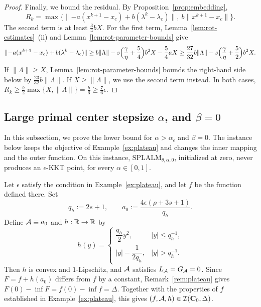 \begin{proof}
Finally, we bound the residual. By Proposition~\ref{prop:embedding},
\[
R_k=\max\bigl\{\|{-a}(x^{k+1}-x_c)+b(\lambda^k-\lambda_c)\|,\
b\|x^{k+1}-x_c\|\bigr\}.
\]
The second term is at least \(\frac34bX\). For the first term,
Lemma~\ref{lem:rot-estimates}~(ii) and Lemma~\ref{lem:rot-parameter-bounds} give
\[
\|{-a}(x^{k+1}-x_c)+b(\lambda^k-\lambda_c)\|
\ge b\|\Lambda\|-s\Bigl(\frac{\gamma}{\eta}+\frac54\Bigr)b^2X-\frac54aX
\ge\frac{27}{32}b\|\Lambda\|-s\Bigl(\frac{\gamma}{\eta}+\frac52\Bigr)b^2X .
\]
If \(\|\Lambda\|\ge X\), Lemma~\ref{lem:rot-parameter-bounds} bounds the
right-hand side below by \(\frac{23}{32}b\|\Lambda\|\). If
\(X\ge\|\Lambda\|\), we use the second term instead. In both cases,
\(R_k\ge\frac b2\max\{X,\|\Lambda\|\}=\frac b6\ge\frac76\epsilon\).
\end{proof}
 


\subsection{Large primal center stepsize \texorpdfstring{$\alpha$}{alpha}, and \texorpdfstring{$\beta=0$}{beta=0}}
\label{subsec:lb-huber}

In this subsection, we prove the lower bound for \(\alpha>\alpha_\epsilon\)
and \(\beta=0\). The instance below keeps the objective of
Example~\ref{ex:plateau} and changes the inner mapping and the outer
function. On this instance, \(\mathrm{SPLALM}_{\theta,\alpha,0}\), initialized
at zero, never produces an \(\epsilon\)-KKT point, for every
\(\alpha\in[0,1]\).

\begin{example}
\label{ex:huber}
Let \(\epsilon\) satisfy the condition in Example~\ref{ex:plateau}, and let
\(f\) be the function defined there. Set
\[
q_h:=2s+1,
\qquad
a_0:=\frac{4\epsilon(\rho+3s+1)}{q_h}.
\]
Define \(\mathcal{A}\equiv a_0\) and \(h:\mathbb{R}\to\mathbb{R}\) by
\[
h(y)=
\begin{cases}
\dfrac{q_h}{2}y^2, & |y|\le q_h^{-1},\\[4pt]
|y|-\dfrac{1}{2q_h}, & |y|>q_h^{-1}.
\end{cases}
\]
Then \(h\) is convex and \(1\)-Lipschitz, and \(\mathcal{A}\) satisfies
\(L_{\mathcal{A}}=G_{\mathcal{A}}=0\). Since \(F=f+h(a_0)\) differs from \(f\) by a
constant, Remark~\ref{rem:plateau} gives
\(F(0)-\inf F=f(0)-\inf f=\Delta\). Together with the properties of \(f\)
established in Example~\ref{ex:plateau}, this gives
\((f,\mathcal{A},h)\in\mathcal I(\mathbf C_0,\Delta)\).
\end{example}

